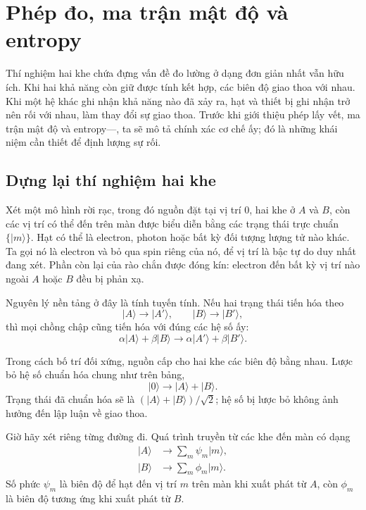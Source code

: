 \chapter{Phép đo, ma trận mật độ và entropy}

Thí nghiệm hai khe chứa đựng vấn đề đo lường ở dạng đơn giản nhất vẫn hữu ích. Khi hai khả năng còn giữ được tính kết hợp, các biên độ giao thoa với nhau. Khi một hệ khác ghi nhận khả năng nào đã xảy ra, hạt và thiết bị ghi nhận trở nên rối với nhau, làm thay đổi sự giao thoa. Trước khi giới thiệu phép lấy vết, ma trận mật độ và entropy---, ta sẽ mô tả chính xác cơ chế ấy; đó là những khái niệm cần thiết để định lượng sự rối.

\section{Dựng lại thí nghiệm hai khe}

Xét một mô hình rời rạc, trong đó nguồn đặt tại vị trí \(0\), hai khe ở \(A\) và \(B\), còn các vị trí có thể đến trên màn được biểu diễn bằng các trạng thái trực chuẩn \(\{|m\rangle\}\). Hạt có thể là electron, photon hoặc bất kỳ đối tượng lượng tử nào khác. Ta gọi nó là electron và bỏ qua spin riêng của nó, để vị trí là bậc tự do duy nhất đang xét. Phần còn lại của rào chắn được đóng kín: electron đến bất kỳ vị trí nào ngoài \(A\) hoặc \(B\) đều bị phản xạ.

Nguyên lý nền tảng ở đây là tính tuyến tính. Nếu hai trạng thái tiến hóa theo
\begin{equation}
|A\rangle\longrightarrow |A'\rangle,
\qquad
|B\rangle\longrightarrow |B'\rangle,
\end{equation}
thì mọi chồng chập cũng tiến hóa với đúng các hệ số ấy:
\begin{equation}
\alpha|A\rangle+\beta|B\rangle
\longrightarrow
\alpha|A'\rangle+\beta|B'\rangle.
\end{equation}

Trong cách bố trí đối xứng, nguồn cấp cho hai khe các biên độ bằng nhau. Lược bỏ hệ số chuẩn hóa chung như trên bảng,
\begin{equation}
|0\rangle\longrightarrow |A\rangle+|B\rangle.
\end{equation}
Trạng thái đã chuẩn hóa sẽ là \((|A\rangle+|B\rangle)/\sqrt{2}\); hệ số bị lược bỏ không ảnh hưởng đến lập luận về giao thoa.

Giờ hãy xét riêng từng đường đi. Quá trình truyền từ các khe đến màn có dạng
\begin{align}
|A\rangle &\longrightarrow \sum_m \psi_m|m\rangle, \\
|B\rangle &\longrightarrow \sum_m \phi_m|m\rangle.
\end{align}
Số phức \(\psi_m\) là biên độ để hạt đến vị trí \(m\) trên màn khi xuất phát từ \(A\), còn \(\phi_m\) là biên độ tương ứng khi xuất phát từ \(B\).

